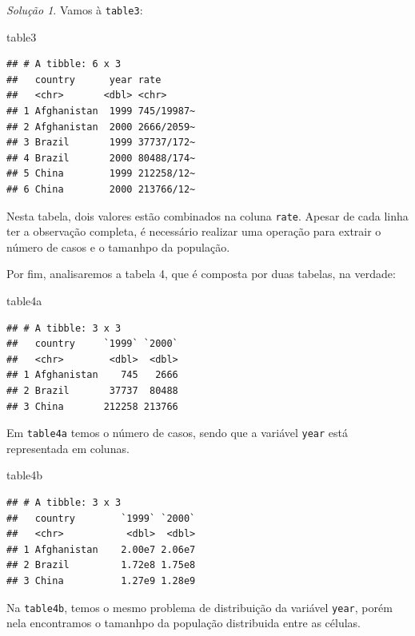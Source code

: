 \documentclass[
]{latex/krantz}
\newenvironment{Shaded}{\begin{snugshade}}{\end{snugshade}}
\newcommand{\NormalTok}[1]{#1}
\theoremstyle{definition}
\theoremstyle{definition}
\theoremstyle{definition}
\theoremstyle{definition}
\theoremstyle{remark}
\newtheorem*{solution}{Solução}
\begin{document}
\begin{solution}
Vamos à \texttt{table3}:

\begin{Shaded}
\begin{Highlighting}[]
\NormalTok{table3}
\end{Highlighting}
\end{Shaded}

\begin{verbatim}
## # A tibble: 6 x 3
##   country      year rate      
##   <chr>       <dbl> <chr>     
## 1 Afghanistan  1999 745/19987~
## 2 Afghanistan  2000 2666/2059~
## 3 Brazil       1999 37737/172~
## 4 Brazil       2000 80488/174~
## 5 China        1999 212258/12~
## 6 China        2000 213766/12~
\end{verbatim}

Nesta tabela, dois valores estão combinados na coluna \texttt{rate}. Apesar de cada linha ter a observação completa, é necessário realizar uma operação para extrair o número de casos e o tamanhpo da população.

Por fim, analisaremos a tabela 4, que é composta por duas tabelas, na verdade:

\begin{Shaded}
\begin{Highlighting}[]
\NormalTok{table4a}
\end{Highlighting}
\end{Shaded}

\begin{verbatim}
## # A tibble: 3 x 3
##   country     `1999` `2000`
##   <chr>        <dbl>  <dbl>
## 1 Afghanistan    745   2666
## 2 Brazil       37737  80488
## 3 China       212258 213766
\end{verbatim}

Em \texttt{table4a} temos o número de casos, sendo que a variável \texttt{year} está representada em colunas.

\begin{Shaded}
\begin{Highlighting}[]
\NormalTok{table4b}
\end{Highlighting}
\end{Shaded}

\begin{verbatim}
## # A tibble: 3 x 3
##   country        `1999` `2000`
##   <chr>           <dbl>  <dbl>
## 1 Afghanistan    2.00e7 2.06e7
## 2 Brazil         1.72e8 1.75e8
## 3 China          1.27e9 1.28e9
\end{verbatim}

Na \texttt{table4b}, temos o mesmo problema de distribuição da variável \texttt{year}, porém nela encontramos o tamanhpo da população distribuida entre as células.
\end{solution}
\end{document}

